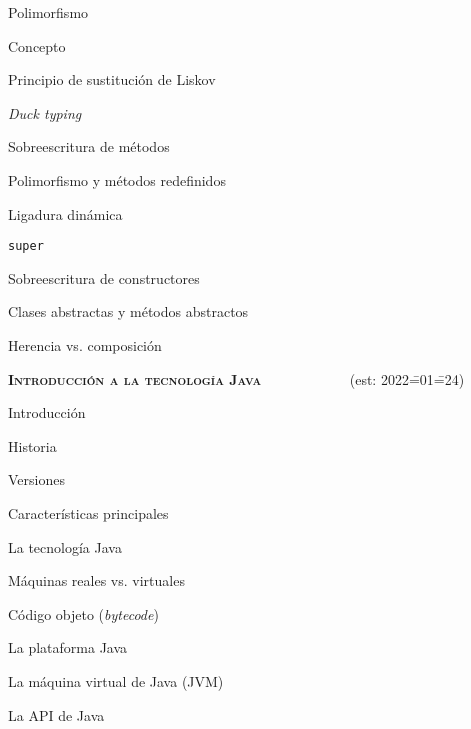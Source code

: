 \begin{longenum}
\begin{longenum}
\begin{longenum}
        \end{longenum}
        \item Polimorfismo
        \begin{longenum}
            \item Concepto
            \item Principio de sustitución de Liskov
            \item \textit{Duck typing}
            \item Sobreescritura de métodos
            \begin{longenum}
                \item Polimorfismo y métodos redefinidos
            \end{longenum}
            \item Ligadura dinámica
            \item \texttt{super}
            \item Sobreescritura de constructores
            \item Clases abstractas y métodos abstractos
        \end{longenum}
        \item Herencia vs. composición
    \end{longenum}
    \item \textbf{\textsc{Introducción a la tecnología Java}} \ \ \ \ \ \ \ \ \ \ \ \ (est: 2022\==01\==24)
    \begin{longenum}
        \item Introducción
        \begin{longenum}
            \item Historia
            \item Versiones
            \item Características principales
        \end{longenum}
        \item La tecnología Java
        \begin{longenum}
            \item Máquinas reales vs. virtuales
            \item Código objeto (\textit{bytecode})
            \item La plataforma Java
            \begin{longenum}
                \item La máquina virtual de Java (JVM)
                \item La API de Java

\end{longenum}
\end{longenum}
\end{longenum}
\end{longenum}

